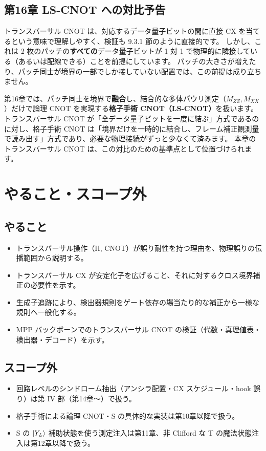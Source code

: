 \subsection{第16章 LS-CNOT への対比予告}\label{subsec:ls_preview}

トランスバーサル CNOT は、対応するデータ量子ビットの間に直接 CX を当てるという意味で理解しやすく、検証も 9.3.1 節のように直接的です。
しかし、これは 2 枚のパッチの\textbf{すべての}データ量子ビットが 1 対 1 で物理的に隣接している（あるいは配線できる）ことを前提にしています。
パッチの大きさが増えたり、パッチ同士が境界の一部でしか接していない配置では、この前提は成り立ちません。

第16章では、パッチ同士を境界で\textbf{融合}し、結合的な多体パウリ測定（$M_{ZZ}, M_{XX}$）だけで論理 CNOT を実現する\textbf{格子手術 CNOT（LS-CNOT）}を扱います。
トランスバーサル CNOT が「全データ量子ビットを一度に結ぶ」方式であるのに対し、格子手術 CNOT は「境界だけを一時的に結合し、フレーム補正観測量で読み出す」方式であり、必要な物理接続がずっと少なくて済みます。
本章のトランスバーサル CNOT は、この対比のための基準点として位置づけられます。

\section{やること・スコープ外}\label{ch9:scope}

\subsection{やること}

\begin{itemize}
  \item トランスバーサル操作（H, CNOT）が誤り耐性を持つ理由を、物理誤りの伝播範囲から説明する。
  \item トランスバーサル CX が安定化子を広げること、それに対するクロス境界補正の必要性を示す。
  \item 生成子追跡により、検出器規則をゲート依存の場当たり的な補正から一様な規則へ一般化する。
  \item MPP バックボーンでのトランスバーサル CNOT の検証（代数・真理値表・検出器・デコード）を示す。
\end{itemize}

\subsection{スコープ外}

\begin{itemize}
  \item 回路レベルのシンドローム抽出（アンシラ配置・CX スケジュール・hook 誤り）は第 IV 部（第14章〜）で扱う。
  \item 格子手術による論理 CNOT・S の具体的な実装は第10章以降で扱う。
  \item S の $\ket{Y_L}$ 補助状態を使う測定注入は第11章、非 Clifford な T の魔法状態注入は第12章以降で扱う。
\end{itemize}

